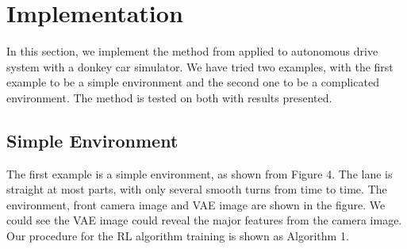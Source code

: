 \documentclass{article} %
\begin{document}
\section{Implementation}
In this section, we implement the method from \cite{dalal2018safe} applied to autonomous drive system with a donkey car simulator. We have tried two examples, with the first example to be a simple environment and the second one to be a complicated environment. The method is tested on both with results presented.

\subsection{Simple Environment}
The first example is a simple environment, as shown from Figure 4. The lane is straight at most parts, with only several smooth turns from time to time. The environment, front camera image and VAE image are shown in the figure. We could see the VAE image could reveal the major features from the camera image. Our procedure for the RL algorithm training is shown as Algorithm 1.
\end{document}

